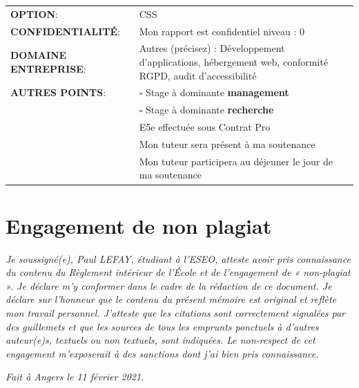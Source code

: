 \documentclass[12pt]{article}
\begin{document}
\begin{center}
	\begin{tabular}{ m{5cm} m{11.5cm} }
	\textbf{OPTION}: &  \mbox{\ooalign{$\checkmark$\cr\hidewidth$\square$\hidewidth\cr}} CSS  \\
    \textbf{CONFIDENTIALITÉ}:  & Mon rapport est confidentiel niveau : \mbox{\ooalign{$\checkmark$\cr\hidewidth$\square$\hidewidth\cr}} 0 \\
    \textbf{DOMAINE ENTREPRISE}: & \mbox{\ooalign{$\checkmark$\cr\hidewidth$\square$\hidewidth\cr}} Autres (précisez) : Développement d'applications, hébergement web, conformité RGPD, audit d'accessibilité \\
    \textbf{AUTRES POINTS}: &  $\square$ Stage à dominante \textbf{management} \\
                             &  $\square$ Stage à dominante \textbf{recherche} \\
                             & \mbox{\ooalign{$\checkmark$\cr\hidewidth$\square$\hidewidth\cr}} E5e effectuée sous Contrat Pro \\
                             &  \mbox{\ooalign{$\checkmark$\cr\hidewidth$\square$\hidewidth\cr}} Mon tuteur sera présent à ma soutenance \\
                             &  \mbox{\ooalign{$\checkmark$\cr\hidewidth$\square$\hidewidth\cr}} Mon tuteur participera au déjeuner le jour de ma soutenance \\
\end{tabular}
\end{center}

\newpage
\section*{Engagement de non plagiat}
\textit{Je soussigné(e), Paul LEFAY, étudiant à l'\gls{ESEO}, atteste avoir pris connaissance du contenu du Règlement intérieur de l'École et de l'engagement de « non-plagiat ». 
Je déclare m'y conformer dans le cadre de la rédaction de ce document. 
Je déclare sur l'honneur que le contenu du présent mémoire est original et reflète mon travail personnel. 
J'atteste que les citations sont correctement signalées par des guillemets et que les sources de tous les emprunts ponctuels à d'autres auteur(e)s, textuels ou non textuels, sont indiquées. 
Le non-respect de cet engagement m'exposerait à des sanctions dont j'ai bien pris connaissance.}

\textit{Fait à Angers le 11 février 2021.}
\end{document}
